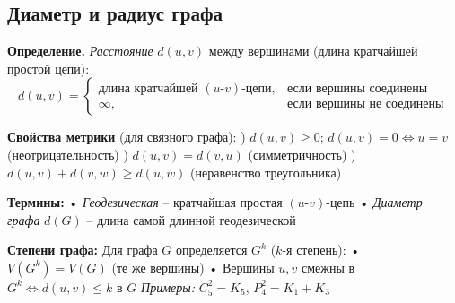 \subsection{Диаметр и радиус графа}

\noindent\textbf{Определение.} \textit{Расстояние} $d(u,v)$ между вершинами (длина кратчайшей простой цепи):
\[ d(u,v) = \begin{cases} 
\text{длина кратчайшей }(u\text{-}v)\text{-цепи}, & \text{если вершины соединены} \\
\infty, & \text{если вершины не соединены}
\end{cases} \]

\noindent\textbf{Свойства метрики} (для связного графа):
) $d(u,v) \geq 0$; $d(u,v) = 0 \Leftrightarrow u = v$ (неотрицательность)
) $d(u,v) = d(v,u)$ (симметричность)
) $d(u,v) + d(v,w) \geq d(u,w)$ (неравенство треугольника)

\noindent\textbf{Термины:}
\noindent • \textit{Геодезическая} -- кратчайшая простая $(u\text{-}v)$-цепь
\noindent • \textit{Диаметр графа} $d(G)$ -- длина самой длинной геодезической

\noindent\textbf{Степени графа:} 
\noindent Для графа $G$ определяется $G^k$ ($k$-я степень):
\noindent • $V(G^k) = V(G)$ (те же вершины)
\noindent • Вершины $u,v$ смежны в $G^k \Leftrightarrow d(u,v) \leq k$ в $G$
\noindent\textit{Примеры:} $C_5^2 = K_5$, $P_4^2 = K_1 + K_3$